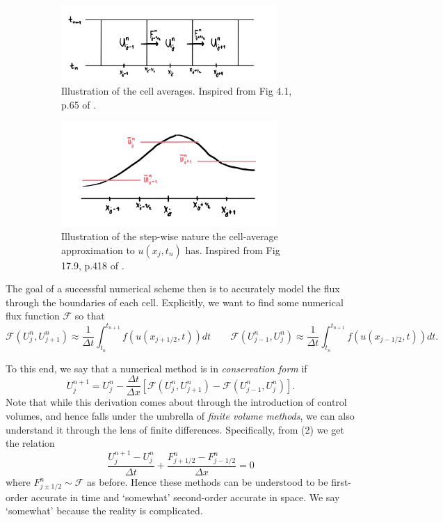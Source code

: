 \documentclass{myproject}
\begin{document}
\begin{figure}[h]
    \centering
    \begin{subfigure}[b]{0.8\textwidth}
        \centering
        \includegraphics[width=0.90\textwidth]{control_volumes.png}
        \caption{Illustration of the cell averages. Inspired from Fig 4.1, p.65 of \cite{leveque2002}.}
    \end{subfigure}

    \vspace{\floatsep}

    \begin{subfigure}{0.8\textwidth}
        \centering
        \includegraphics[width=0.90\textwidth]{step-wise_approx.png}
        \caption{Illustration of the step-wise nature the cell-average approximation to $u(x_j,t_n)$ has. Inspired from Fig 17.9, p.418 of \cite{iserles2009}.}
    \end{subfigure}
    \caption{}
\end{figure}

The goal of a successful numerical scheme then is to accurately model the flux through the boundaries of each cell. Explicitly, we want to find some numerical flux function $\mathcal{F}$ so that 
\[
    \mathcal{F}(U_j^n, U_{j+1}^n) \approx \frac{1}{\Delta t} \int_{t_n}^{t_{n+1}} f(u(x_{j+1/2}, t)) dt \qquad \mathcal{F}(U_{j-1}^n, U_{j}^n) \approx \frac{1}{\Delta t} \int_{t_n}^{t_{n+1}} f(u(x_{j-1/2}, t)) dt.
\]

To this end, we say that a numerical method is in \emph{conservation form} if 
\[
    U_j^{n+1} = U_j^n - \frac{\Delta t}{\Delta x} \left[ \mathcal{F}(U_{j}^{n}, U_{j+1}^{n}) - \mathcal{F}(U_{j-1}^{n}, U_{j}^{n}) \right].
\]
Note that while this derivation comes about through the introduction of control volumes, and hence falls under the umbrella of \emph{finite volume methods}, we can also understand it through the lens of finite differences. Specifically, from (2) we get the relation
\[
    \frac{U_j^{n+1} - U_j^n}{\Delta t} + \frac{F_{j+1/2}^n - F_{j-1/2}^n}{\Delta x} = 0
\]
where $F_{j\pm1/2}^n \sim \mathcal{F}$ as before. Hence these methods can be understood to be first-order accurate in time and `somewhat' second-order accurate in space. We say `somewhat' because the reality is complicated.

\nocite{choksi2022}
\nocite{iserles2009}
\nocite{leveque1992}
\nocite{leveque2002}
\printbibliography
\end{document}
